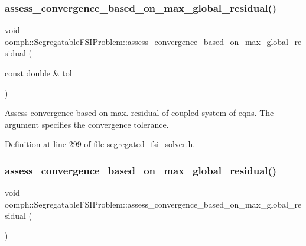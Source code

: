 \subsubsection{\texorpdfstring{assess\+\_\+convergence\+\_\+based\+\_\+on\+\_\+max\+\_\+global\+\_\+residual()}{assess\_convergence\_based\_on\_max\_global\_residual()}\hspace{0.1cm}{\footnotesize\ttfamily [1/2]}}
{\footnotesize\ttfamily void oomph\+::\+Segregatable\+F\+S\+I\+Problem\+::assess\+\_\+convergence\+\_\+based\+\_\+on\+\_\+max\+\_\+global\+\_\+residual (\begin{DoxyParamCaption}\item[{const double \&}]{tol }\end{DoxyParamCaption})\hspace{0.3cm}{\ttfamily [inline]}}



Assess convergence based on max. residual of coupled system of eqns. The argument specifies the convergence tolerance. 



Definition at line 299 of file segregated\+\_\+fsi\+\_\+solver.\+h.

\mbox{\label{classoomph_1_1SegregatableFSIProblem_a2fba426552e48abb7ff8a554c20953da}} 
\subsubsection{\texorpdfstring{assess\+\_\+convergence\+\_\+based\+\_\+on\+\_\+max\+\_\+global\+\_\+residual()}{assess\_convergence\_based\_on\_max\_global\_residual()}\hspace{0.1cm}{\footnotesize\ttfamily [2/2]}}
{\footnotesize\ttfamily void oomph\+::\+Segregatable\+F\+S\+I\+Problem\+::assess\+\_\+convergence\+\_\+based\+\_\+on\+\_\+max\+\_\+global\+\_\+residual (\begin{DoxyParamCaption}{ }\end{DoxyParamCaption})\hspace{0.3cm}{\ttfamily [inline]}}



